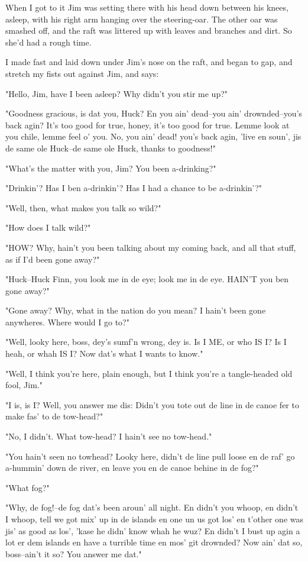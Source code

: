 When I got to it Jim was setting there with his head down between his
knees, asleep, with his right arm hanging over the steering-oar.  The
other oar was smashed off, and the raft was littered up with leaves and
branches and dirt.  So she'd had a rough time.

I made fast and laid down under Jim's nose on the raft, and began to gap,
and stretch my fists out against Jim, and says:

"Hello, Jim, have I been asleep?  Why didn't you stir me up?"

"Goodness gracious, is dat you, Huck?  En you ain' dead--you ain'
drownded--you's back agin?  It's too good for true, honey, it's too
good for true. Lemme look at you chile, lemme feel o' you.  No, you ain'
dead! you's back agin, 'live en soun', jis de same ole Huck--de same ole
Huck, thanks to goodness!"

"What's the matter with you, Jim?  You been a-drinking?"

"Drinkin'?  Has I ben a-drinkin'?  Has I had a chance to be a-drinkin'?"

"Well, then, what makes you talk so wild?"

"How does I talk wild?"

"HOW?  Why, hain't you been talking about my coming back, and all that
stuff, as if I'd been gone away?"

"Huck--Huck Finn, you look me in de eye; look me in de eye.  HAIN'T you
ben gone away?"

"Gone away?  Why, what in the nation do you mean?  I hain't been gone
anywheres.  Where would I go to?"

"Well, looky here, boss, dey's sumf'n wrong, dey is.  Is I ME, or who IS
I? Is I heah, or whah IS I?  Now dat's what I wants to know."

"Well, I think you're here, plain enough, but I think you're a
tangle-headed old fool, Jim."

"I is, is I?  Well, you answer me dis:  Didn't you tote out de line in de
canoe fer to make fas' to de tow-head?"

"No, I didn't.  What tow-head?  I hain't see no tow-head."

"You hain't seen no towhead?  Looky here, didn't de line pull loose en de
raf' go a-hummin' down de river, en leave you en de canoe behine in de
fog?"

"What fog?"

"Why, de fog!--de fog dat's been aroun' all night.  En didn't you whoop,
en didn't I whoop, tell we got mix' up in de islands en one un us got
los' en t'other one was jis' as good as los', 'kase he didn' know whah he
wuz? En didn't I bust up agin a lot er dem islands en have a turrible
time en mos' git drownded?  Now ain' dat so, boss--ain't it so?  You
answer me dat."


